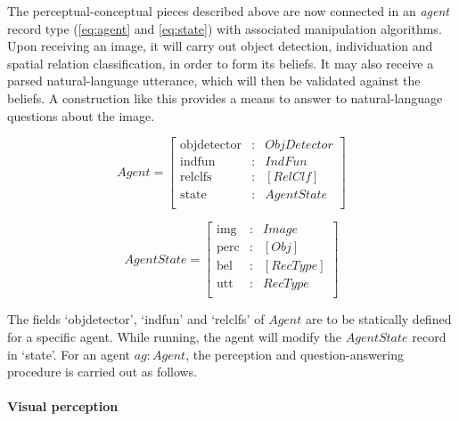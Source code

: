 The perceptual-conceptual pieces described above are now connected in an \textit{agent} record type (\autoref{eq:agent} and \autoref{eq:state}) with associated manipulation algorithms.
Upon receiving an image, it will carry out object detection, individuation and spatial relation classification, in order to form its beliefs.
It may also receive a parsed natural-language utterance, which will then be validated against the beliefs.
A construction like this provides a means to answer to natural-language questions about the image.

\begin{equation}\label{eq:agent}
Agent = \left[\begin{array}{rcl}
    \text{objdetector} &:& ObjDetector \\
    \text{indfun} &:& IndFun \\
    \text{relclfs} &:& [RelClf] \\
    \text{state} &:& AgentState \\
    \end{array}\right]
\end{equation}

\begin{equation}\label{eq:state}
AgentState = \left[\begin{array}{rcl}
    \text{img} &:& Image \\
    \text{perc} &:& [Obj] \\
    \text{bel} &:& [RecType] \\
    \text{utt} &:& RecType \\
    \end{array}\right]
\end{equation}

The fields `objdetector', `indfun' and `relclfs' of $Agent$ are to be statically defined for a specific agent.
While running, the agent will modify the $AgentState$ record in `state'.
For an agent $ag : Agent$, the perception and question-answering procedure is carried out as follows.

\paragraph{Visual perception}

